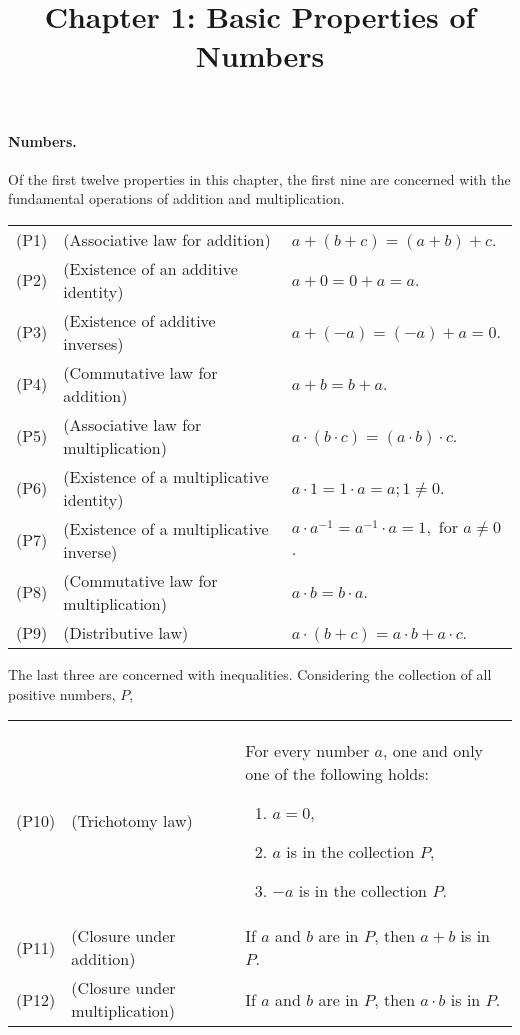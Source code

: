 \documentclass{article}
\begin{document}
\title{Chapter 1: Basic Properties of Numbers}
\maketitle

\paragraph{Numbers.} Of the first twelve properties in this chapter, the first
nine are concerned with the fundamental operations of addition and
multiplication.

\begin{tabular}{l l p{4in}}
  (P1) & (Associative law for addition) & $a + (b + c) = (a + b) + c$. \\
  (P2) & (Existence of an additive identity) & $a + 0 = 0 + a = a$. \\
  (P3) & (Existence of additive inverses) & $a + (-a) = (-a) + a = 0$. \\
  (P4) & (Commutative law for addition) & $a + b = b + a$. \\
  (P5) & (Associative law for multiplication)
  & $a \cdot (b \cdot c) = (a \cdot b) \cdot c$. \\
  (P6) & (Existence of a multiplicative identity)
  & $a \cdot 1 = 1 \cdot a = a; 1 \neq 0$. \\
  (P7) & (Existence of a multiplicative inverse)
  & $a \cdot a^{-1} = a^{-1} \cdot a = 1, \text{ for } a \neq 0$. \\
  (P8) & (Commutative law for multiplication) & $a \cdot b = b \cdot a$. \\
  (P9) & (Distributive law) & $a \cdot (b + c) = a \cdot b + a \cdot c$.
\end{tabular}

The last three are concerned with inequalities. Considering the collection of
all positive numbers, $P$,

\begin{tabular}{l l p{2.5in}}
  (P10) & (Trichotomy law) & For every number $a$, one and only one of the
  following holds: \begin{enumerate}
    \itemsep0em
    \item $a = 0$,
    \item $a$ is in the collection $P$,
    \item $-a$ is in the collection $P$.
  \end{enumerate} \\
  (P11) & (Closure under addition) & If $a$ and $b$ are in $P$, then $a + b$ is
  in $P$. \\
  (P12) & (Closure under multiplication) & If $a$ and $b$ are in $P$, then $a
  \cdot b$ is in $P$.
\end{tabular}
\end{document}
